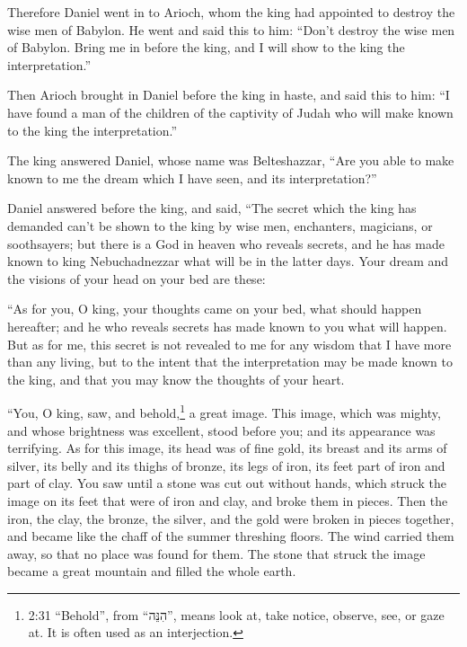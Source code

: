  Therefore Daniel went in to Arioch, whom the king had
appointed to destroy the wise men of Babylon. He went and said this to
him: ``Don't destroy the wise men of Babylon. Bring me in before the
king, and I will show to the king the interpretation.''

 Then Arioch brought in Daniel before the king in haste,
and said this to him: ``I have found a man of the children of the
captivity of Judah who will make known to the king the interpretation.''

 The king answered Daniel, whose name was Belteshazzar,
``Are you able to make known to me the dream which I have seen, and its
interpretation?''

 Daniel answered before the king, and said, ``The secret
which the king has demanded can't be shown to the king by wise men,
enchanters, magicians, or soothsayers;  but there is a God
in heaven who reveals secrets, and he has made known to king
Nebuchadnezzar what will be in the latter days. Your dream and the
visions of your head on your bed are these:

 ``As for you, O king, your thoughts came on your bed, what
should happen hereafter; and he who reveals secrets has made known to
you what will happen.  But as for me, this secret is not
revealed to me for any wisdom that I have more than any living, but to
the intent that the interpretation may be made known to the king, and
that you may know the thoughts of your heart.

 ``You, O king, saw, and behold,\footnote{2:31 ``Behold'',
  from ``הִנֵּה'', means look at, take notice, observe, see, or gaze at.
  It is often used as an interjection.} a great image. This image, which
was mighty, and whose brightness was excellent, stood before you; and
its appearance was terrifying.  As for this image, its head
was of fine gold, its breast and its arms of silver, its belly and its
thighs of bronze,  its legs of iron, its feet part of iron
and part of clay.  You saw until a stone was cut out
without hands, which struck the image on its feet that were of iron and
clay, and broke them in pieces.  Then the iron, the clay,
the bronze, the silver, and the gold were broken in pieces together, and
became like the chaff of the summer threshing floors. The wind carried
them away, so that no place was found for them. The stone that struck
the image became a great mountain and filled the whole earth.

